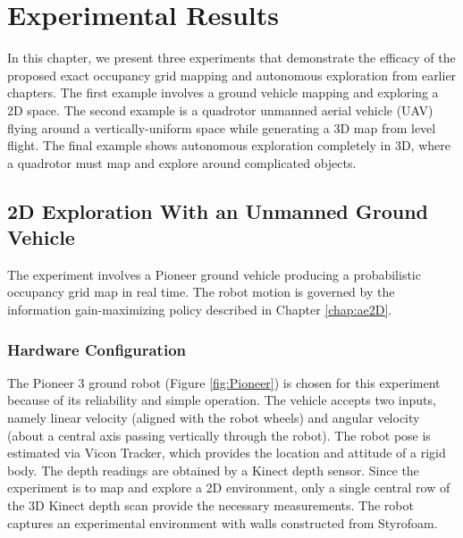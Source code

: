 
\chapter{Experimental Results}\label{chap:Experiments}

In this chapter, we present three experiments that demonstrate the efficacy of the proposed exact occupancy grid mapping and autonomous exploration from earlier chapters. The first example involves a ground vehicle mapping and exploring a 2D space. The second example is a quadrotor unmanned aerial vehicle (UAV) flying around a vertically-uniform space while generating a 3D map from level flight. The final example shows autonomous exploration completely in 3D, where a quadrotor must map and explore around complicated objects.

\section{2D Exploration With an Unmanned Ground Vehicle}
\label{sec:PioneerNRL}

The experiment involves a Pioneer ground vehicle producing a probabilistic occupancy grid map in real time. The robot motion is governed by the information gain-maximizing policy described in Chapter \ref{chap:ae2D}.


\subsection{Hardware Configuration}
The Pioneer 3 ground robot (Figure \ref{fig:Pioneer}) is chosen for this experiment because of its reliability and simple operation. The vehicle accepts two inputs, namely linear velocity (aligned with the robot wheels) and angular velocity (about a central axis passing vertically through the robot). The robot pose is estimated via Vicon Tracker, which provides the location and attitude of a rigid body. The depth readings are obtained by a Kinect depth sensor. Since the experiment is to map and explore a 2D environment, only a single central row of the 3D Kinect depth scan provide the necessary measurements. The robot captures an experimental environment with walls constructed from Styrofoam.

